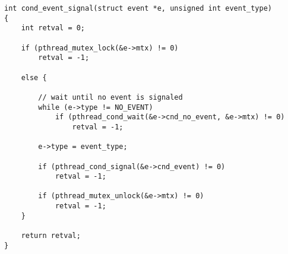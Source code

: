 \begin{lstlisting}[title=event.c]
int cond_event_signal(struct event *e, unsigned int event_type)
{
    int retval = 0;

    if (pthread_mutex_lock(&e->mtx) != 0)
        retval = -1;

    else {

        // wait until no event is signaled
        while (e->type != NO_EVENT)
            if (pthread_cond_wait(&e->cnd_no_event, &e->mtx) != 0)
                retval = -1;

        e->type = event_type;

        if (pthread_cond_signal(&e->cnd_event) != 0)
            retval = -1;

        if (pthread_mutex_unlock(&e->mtx) != 0)
            retval = -1;
    }

    return retval;
}
\end{lstlisting}
